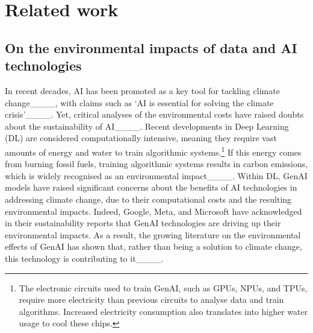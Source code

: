 \section{Related work}
\subsection{On the environmental impacts of data and AI technologies}

In recent decades, AI has been promoted as a key tool for tackling climate change____, with claims such as `AI is essential for solving the climate crisis'____. Yet, critical analyses of the environmental costs have raised doubts about the sustainability of AI____.  Recent developments in Deep Learning (DL) are considered computationally intensive, meaning they require vast amounts of energy and water to train algorithmic systems.\footnote{The electronic circuits used to train GenAI, such as GPUs, NPUs, and TPUs, require more electricity than previous circuits to analyse data and train algorithms. Increased electricity consumption also translates into higher water usage to cool these chips.} If this energy comes from burning fossil fuels, training algorithmic systems results in carbon emissions, which is widely recognised as an environmental impact____. Within DL, GenAI models have raised significant concerns about the benefits of AI technologies in addressing climate change, due to their computational costs and the resulting environmental impacts. Indeed, Google, Meta, and Microsoft have acknowledged in their sustainability reports that GenAI technologies are driving up their environmental impacts. As a result, the growing literature on the environmental effects of GenAI has shown that, rather than being a solution to climate change, this technology is contributing to it____.

